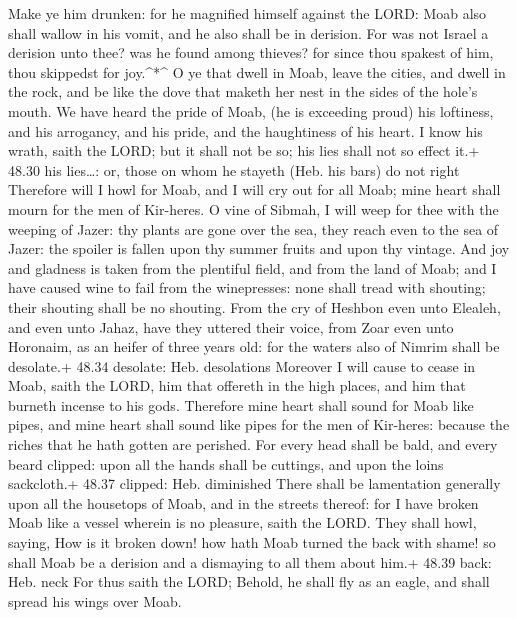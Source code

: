  Make ye him drunken: for he magnified himself against the
LORD: Moab also shall wallow in his vomit, and he also shall be in
derision.  For was not Israel a derision unto thee? was he
found among thieves? for since thou spakest of him, thou skippedst for
joy.\^{}*\^{}  O ye that dwell in Moab, leave the cities,
and dwell in the rock, and be like the dove that maketh her nest in the
sides of the hole's mouth.  We have heard the pride of
Moab, (he is exceeding proud) his loftiness, and his arrogancy, and his
pride, and the haughtiness of his heart.  I know his wrath,
saith the LORD; but it shall not be so; his lies shall not so effect
it.+ 48.30 his lies\ldots: or, those on whom he stayeth (Heb. his bars)
do not right  Therefore will I howl for Moab, and I will
cry out for all Moab; mine heart shall mourn for the men of Kir-heres.
 O vine of Sibmah, I will weep for thee with the weeping of
Jazer: thy plants are gone over the sea, they reach even to the sea of
Jazer: the spoiler is fallen upon thy summer fruits and upon thy
vintage.  And joy and gladness is taken from the plentiful
field, and from the land of Moab; and I have caused wine to fail from
the winepresses: none shall tread with shouting; their shouting shall be
no shouting.  From the cry of Heshbon even unto Elealeh,
and even unto Jahaz, have they uttered their voice, from Zoar even unto
Horonaim, as an heifer of three years old: for the waters also of Nimrim
shall be desolate.+ 48.34 desolate: Heb. desolations 
Moreover I will cause to cease in Moab, saith the LORD, him that
offereth in the high places, and him that burneth incense to his gods.
 Therefore mine heart shall sound for Moab like pipes, and
mine heart shall sound like pipes for the men of Kir-heres: because the
riches that he hath gotten are perished.  For every head
shall be bald, and every beard clipped: upon all the hands shall be
cuttings, and upon the loins sackcloth.+ 48.37 clipped: Heb. diminished
 There shall be lamentation generally upon all the
housetops of Moab, and in the streets thereof: for I have broken Moab
like a vessel wherein is no pleasure, saith the LORD.  They
shall howl, saying, How is it broken down! how hath Moab turned the back
with shame! so shall Moab be a derision and a dismaying to all them
about him.+ 48.39 back: Heb. neck  For thus saith the LORD;
Behold, he shall fly as an eagle, and shall spread his wings over Moab.
